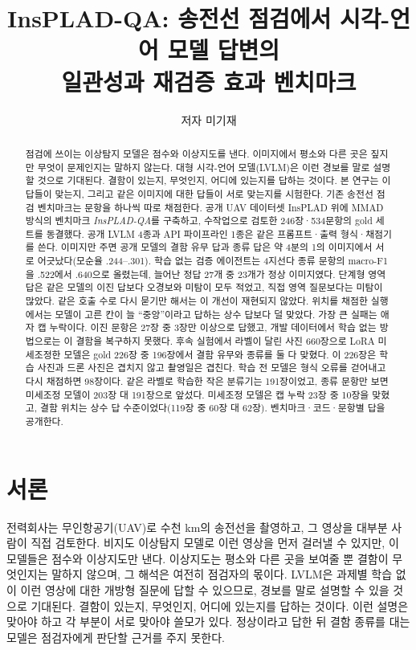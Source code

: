 \documentclass[11pt]{article}
\title{InsPLAD-QA: 송전선 점검에서 시각-언어 모델 답변의\\
일관성과 재검증 효과 벤치마크}
\author{저자 미기재}
\date{}
\begin{document}
\maketitle

\begin{abstract}
점검에 쓰이는 이상탐지 모델은 점수와 이상지도를 낸다. 이미지에서 평소와 다른 곳은 짚지만 무엇이 문제인지는 말하지 않는다. 대형 시각-언어 모델(LVLM)은 이런 경보를 말로 설명할 것으로 기대된다. 결함이 있는지, 무엇인지, 어디에 있는지를 답하는 것이다. 본 연구는 이 답들이 맞는지, 그리고 같은 이미지에 대한 답들이 서로 맞는지를 시험한다. 기존 송전선 점검 벤치마크는 문항을 하나씩 따로 채점한다. 공개 UAV 데이터셋 InsPLAD 위에 MMAD 방식의 벤치마크 \emph{InsPLAD-QA}를 구축하고, 수작업으로 검토한 246장·534문항의 gold 세트를 동결했다. 공개 LVLM 4종과 API 파이프라인 1종은 같은 프롬프트·출력 형식·채점기를 쓴다. 이미지만 주면 공개 모델의 결함 유무 답과 종류 답은 약 4분의 1의 이미지에서 서로 어긋났다(모순율 .244--.301). 학습 없는 검증 에이전트는 4지선다 종류 문항의 macro-F1을 .522에서 .640으로 올렸는데, 늘어난 정답 27개 중 23개가 정상 이미지였다. 단계형 영역 답은 같은 모델의 이진 답보다 오경보와 미탐이 모두 적었고, 직접 영역 질문보다는 미탐이 많았다. 같은 호출 수로 다시 묻기만 해서는 이 개선이 재현되지 않았다. 위치를 채점한 실행에서는 모델이 고른 칸이 늘 ``중앙''이라고 답하는 상수 답보다 덜 맞았다. 가장 큰 실패는 애자 캡 누락이다. 이진 문항은 27장 중 3장만 이상으로 답했고, 개발 데이터에서 학습 없는 방법으로는 이 결함을 복구하지 못했다. 후속 실험에서 라벨이 달린 사진 660장으로 LoRA 미세조정한 모델은 gold 226장 중 196장에서 결함 유무와 종류를 둘 다 맞혔다. 이 226장은 학습 사진과 드론 사진은 겹치지 않고 촬영일은 겹친다. 학습 전 모델은 형식 오류를 걷어내고 다시 채점하면 98장이다. 같은 라벨로 학습한 작은 분류기는 191장이었고, 종류 문항만 보면 미세조정 모델이 203장 대 191장으로 앞섰다. 미세조정 모델은 캡 누락 23장 중 10장을 맞혔고, 결함 위치는 상수 답 수준이었다(119장 중 60장 대 62장). 벤치마크·코드·문항별 답을 공개한다.
\end{abstract}

\section{서론}
전력회사는 무인항공기(UAV)로 수천 km의 송전선을 촬영하고, 그 영상을 대부분 사람이 직접 검토한다. 비지도 이상탐지 모델로 이런 영상을 먼저 걸러낼 수 있지만, 이 모델들은 점수와 이상지도만 낸다. 이상지도는 평소와 다른 곳을 보여줄 뿐 결함이 무엇인지는 말하지 않으며, 그 해석은 여전히 점검자의 몫이다. LVLM은 과제별 학습 없이 이런 영상에 대한 개방형 질문에 답할 수 있으므로, 경보를 말로 설명할 수 있을 것으로 기대된다. 결함이 있는지, 무엇인지, 어디에 있는지를 답하는 것이다. 이런 설명은 맞아야 하고 각 부분이 서로 맞아야 쓸모가 있다. 정상이라고 답한 뒤 결함 종류를 대는 모델은 점검자에게 판단할 근거를 주지 못한다.
\end{document}
